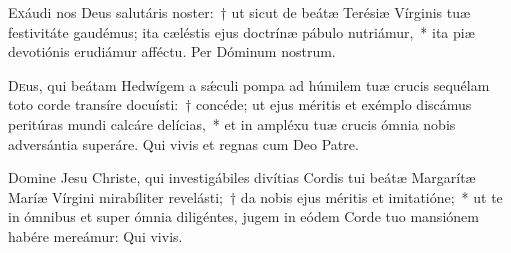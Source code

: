 \documentclass[vesperale_romanum.tex]{subfiles}
\begin{document}
\capitdeseq

\myrule


\duplex

\hymnusbothvespers


\oratio

\lettrine{E}{x}áudi nos Deus salutáris noster:~† ut sicut de beátæ Terésiæ Vírginis tuæ festivitáte gaudémus; ita cæléstis ejus doctrínæ pábulo nutriámur,~* ita piæ devotiónis erudiámur afféctu. Per Dóminum nostrum.


\commsequentis

\myrule


\semiduplex


\oratio

\lettrine{D}{e}us, qui beátam Hedwígem a sǽculi pompa ad húmilem tuæ crucis sequélam toto corde transíre docuísti:~† concéde; ut ejus méritis et exémplo discámus peritúras mundi calcáre delícias,~* et in ampléxu tuæ crucis ómnia nobis adversántia superáre.
Qui vivis et regnas cum Deo Patre.

\vespsequentiscomm

\myrule

\newpage


\duplex

\oratio

\lettrine{D}{o}mine Jesu Christe, qui investigábiles divítias Cordis tui beátæ Margarítæ Maríæ Vírgini mirabíliter revelásti;~† da nobis ejus méritis et imitatióne;~* ut te in ómnibus et super ómnia diligéntes, jugem in eódem Corde tuo mansiónem habére mereámur:
Qui vivis.


\end{document}
